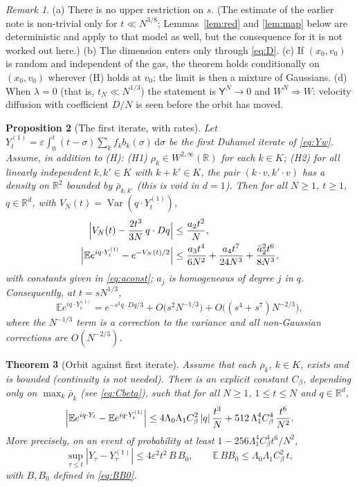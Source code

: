 \documentclass[11pt]{article}
\newcommand{\dd}{\mathrm{d}}
\newcommand{\E}{\mathbb{E}}
\newcommand{\eps}{\varepsilon}
\newcommand{\R}{\mathbb{R}}
\newcommand{\sY}{\mathsf{Y}}
\newcommand{\bbar}{\bar\rho}
\newtheorem{theorem}{Theorem}
\newtheorem{proposition}[theorem]{Proposition}
\theoremstyle{remark}
\newtheorem{remark}[theorem]{Remark}
\begin{document}
\begin{remark}
(a) There is no upper restriction on $s$. (The estimate of the earlier
note is non-trivial only for $t\ll N^{3/8}$; Lemmas~\ref{lem:red} and
\ref{lem:map} below are deterministic and apply to that model as well, but
the consequence for it is not worked out here.)
(b) The dimension enters only through \eqref{eq:D}.
(c) If $(x_0,v_0)$ is random and independent of the gas, the theorem holds
conditionally on $(x_0,v_0)$ wherever \textup{(H)} holds at $v_0$; the limit
is then a mixture of Gaussians.
(d) When $\lambda=0$ (that is, $t_N\ll N^{1/3}$) the statement is
$\sY^N\to0$ and $W^N\Rightarrow W$: velocity diffusion with coefficient
$D/N$ is seen before the orbit has moved.
\end{remark}

\begin{proposition}[The first iterate, with rates]\label{prop:first}
Let $Y^{(1)}_t=\eps\int_0^t(t-\sigma)\sum_kf_kb_k(\sigma)\,\dd\sigma$ be the
first Duhamel iterate of \eqref{eq:Yw}. Assume, in addition to
\textup{(H)}:
\textup{(H1)} $\rho_k\in W^{2,\infty}(\R)$ for each $k\in K$;
\textup{(H2)} for all linearly independent $k,k'\in K$ with $k+k'\in K$, the
pair $(k\cdot v,k'\cdot v)$ has a density on $\R^2$ bounded by
$\bbar_{k,k'}$ (this is void in $d=1$).
Then for all $N\ge1$, $t\ge1$, $q\in\R^d$, with
$V_N(t)=\operatorname{Var}(q\cdot Y^{(1)}_t)$,
\begin{align}
  \Bigl|V_N(t)-\frac{2t^3}{3N}\,q\cdot Dq\Bigr| &\le \frac{a_2t^2}{N},
  \label{eq:var}\\
  \Bigl|\E e^{iq\cdot Y^{(1)}_t}-e^{-V_N(t)/2}\Bigr|
  &\le \frac{a_3t^4}{6N^2}+\frac{a_4t^7}{24N^3}+\frac{\bar a_2^2t^6}{8N^3},
  \label{eq:nongauss}
\end{align}
with constants given in \eqref{eq:aconst}; $a_j$ is homogeneous of degree
$j$ in $q$. Consequently, at $t=sN^{1/3}$,
\[
  \E e^{iq\cdot Y^{(1)}_t}=e^{-s^3q\cdot Dq/3}+O\bigl(s^2N^{-1/3}\bigr)
  +O\bigl((s^4+s^7)N^{-2/3}\bigr),
\]
where the $N^{-1/3}$ term is a correction to the variance and all
non-Gaussian corrections are $O(N^{-2/3})$.
\end{proposition}

\begin{theorem}[Orbit against first iterate]\label{thm:path}
Assume that each $\rho_k$, $k\in K$, exists and is bounded (continuity is
not needed). There is an explicit constant $C_\beta$, depending only on
$\max_k\bbar_k$ (see \eqref{eq:Cbeta}), such that for all $N\ge1$,
$1\le t\le N$ and $q\in\R^d$,
\begin{equation}
  \Bigl|\E e^{iq\cdot Y_t}-\E e^{iq\cdot Y^{(1)}_t}\Bigr|
  \le 4\Lambda_0\Lambda_1C_\beta^2\,|q|\,\frac{t^3}{N}
     +512\,\Lambda_1^4C_\beta^4\,\frac{t^6}{N^2}.
  \label{eq:path}
\end{equation}
More precisely, on an event of probability at least
$1-256\Lambda_1^4C_\beta^4t^6/N^2$,
\begin{equation}
  \sup_{\tau\le t}|Y_\tau-Y^{(1)}_\tau|\le 4\eps^2t^2\,B\,B_0,
  \qquad \E\,BB_0\le\Lambda_0\Lambda_1C_\beta^2\,t,
  \label{eq:pathwise}
\end{equation}
with $B,B_0$ defined in \eqref{eq:BB0}.
\end{theorem}
\end{document}
